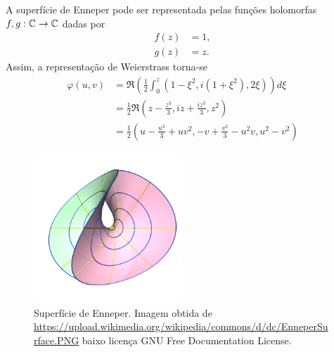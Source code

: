 \begin{exemplo}
	A superfície de Enneper pode ser representada pelas funções holomorfas $f,g: \mathbb{C} \rightarrow \mathbb{C}$ dadas por
	\begin{align*}
	f(z) &= 1, \\
	g(z) &= z.
	\end{align*}
	Assim, a representação de Weierstrass torna-se
	\begin{align*}
	\varphi(u,v) &= \Re \left( \frac{1}{2} \int_{0}^{z} \left( 1 - \xi^2, i (1 + \xi^2), 2\xi \right) \right) d\xi \\
	&= \frac{1}{2} \Re \left( z - \frac{z^3}{3}, iz + \frac{iz^3}{3}, z^2 \right) \\
	&= \frac{1}{2} \left( u - \frac{u^3}{3} + uv^2, -v + \frac{v^3}{3} - u^2v, u^2 - v^2 \right)
	\end{align*}
\end{exemplo}

\begin{figure}
	\centering
	\includegraphics[width=0.5\textwidth]{images/enneper}
	\caption{Superfície de Enneper. Imagem obtida de \url{https://upload.wikimedia.org/wikipedia/commons/d/dc/EnneperSurface.PNG} baixo licença GNU Free Documentation License.}
\end{figure}


